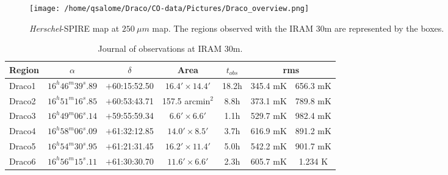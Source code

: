 \documentclass[traditabstract]{aa}
\newcommand{\tfm}[1]{\tablefootmark{#1}}
\begin{document}
%

\begin{figure*}[h!]
  \centering
  \texttt{[image: /home/qsalome/Draco/CO-data/Pictures/Draco\_overview.png]}
  \caption{\label{overview} \emph{Herschel}-SPIRE map at $250\: \mu m$ map. The regions observed with the IRAM 30m are represented by the boxes.}
\end{figure*}

\begin{table*}[h]
  \centering
  \footnotesize
  \caption{\label{table:rms} Journal of observations at IRAM 30m.}
  \begin{tabular}{lcccccc}
    \hline \hline
    Region &      $\alpha$       &    $\delta$    &        Area         & $t_{obs}$ \tfm{a} & \multicolumn{2}{c}{rms \tfm{b}} \\ \hline 
    Draco1 & $16^h 46^m 39^s.89$ & $+$60:15:52.50 & $16.4'\times 14.4'$ &       18.2h       &    345.4 mK    &    656.3 mK    \\
    Draco2 & $16^h 51^m 16^s.85$ & $+$60:53:43.71 &  157.5 arcmin$^2$   &        8.8h       &    373.1 mK    &    789.8 mK    \\
    Draco3 & $16^h 49^m 06^s.14$ & $+$59:55:59.34 &  $6.6'\times 6.6'$  &        1.1h       &    529.7 mK    &    982.4 mK    \\
    Draco4 & $16^h 58^m 06^s.09$ & $+$61:32:12.85 & $14.0'\times 8.5'$  &        3.7h       &    616.9 mK    &    891.2 mK    \\
    Draco5 & $16^h 54^m 30^s.95$ & $+$61:21:31.45 & $16.2'\times 11.4'$ &        5.0h       &    542.2 mK    &    901.7 mK    \\
    Draco6 & $16^h 56^m 15^s.11$ & $+$61:30:30.70 & $11.6'\times 6.6'$  &        2.3h       &    605.7 mK    &    1.234 K     \\ \hline
  \end{tabular}
\end{table*}
\end{document}

